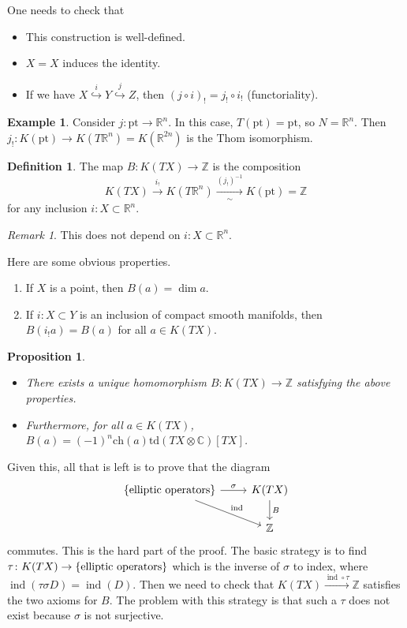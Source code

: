 \documentclass[leqno, openany]{memoir}
\newtheorem{prop}[thm]{Proposition}
\theoremstyle{definition}
\newtheorem{defn}[thm]{Definition}
\newtheorem{exm}[thm]{Example}
\theoremstyle{remark}
\newtheorem{rmk}[thm]{Remark}
\theoremstyle{plain}
\theoremstyle{definition}
\theoremstyle{remark}
\newcommand{\R}{\mathbb{R}}
\newcommand{\C}{\mathbb{C}}
\newcommand{\Z}{\mathbb{Z}}
\newcommand{\mr}[1]{\mathrm{#1}}
\DeclareMathOperator{\ind}{ind}
\begin{document}
One needs to check that \begin{itemize} \item This construction is
    well-defined.  \item $X = X$ induces the identity.  \item If we have $X
    \overset{i}{\hookrightarrow} Y \overset{j}{\hookrightarrow} Z$, then ${(j
    \circ i)}_! = j_! \circ i_{ ! }$ (functoriality).  \end{itemize}

\begin{exm} Consider $j \colon \mr{pt} \to \R^n$. In this case, $T(\mr{pt}) =
\mr{pt}$, so $N = \R^n$. Then $j_! \colon K(\mr{pt}) \to K(T\R^n) = K(\R^{2n})$
is the Thom isomorphism.  \end{exm}

\begin{defn} The map $B \colon K(TX) \to \Z$ is the composition \[ K(TX)
\xrightarrow{i_!} K(T\R^n) \xrightarrow[\sim]{{(j_!)}^{-1}} K(\mr{pt}) = \Z \]
for any inclusion $i \colon X \subset \R^n$.  \end{defn}

\begin{rmk} This does not depend on $i \colon X \subset \R^n$.  \end{rmk}

Here are some obvious properties.  \begin{enumerate} \item If $X$ is a point,
then $B(a) = \dim a$.  \item If $i \colon X \subset Y$ is an inclusion of
compact smooth manifolds, then $B(i_! a) = B(a)$ for all $a \in K(TX)$.
\end{enumerate}

\begin{prop}\leavevmode \begin{itemize} \item There exists a unique
    homomorphism $B \colon K(TX) \to \Z$ satisfying the above properties.
\item Furthermore, for all $a \in K(TX)$, $B(a) = {(-1)}^n \mr{ch}(a)
    \mr{td}(TX \otimes \C) [TX]$.  \end{itemize} \end{prop}

Given this, all that is left is to prove that the diagram \begin{equation*}
    \begin{tikzcd} \qty{\text{elliptic operators}} \ar{r}{\sigma} \ar{dr}{\ind}
    & K(TX) \ar{d}{B} \\ & \Z \end{tikzcd} \end{equation*} commutes. This is
    the hard part of the proof. The basic strategy is to find $\tau \colon
    K(TX) \to \qty{\text{elliptic operators}}$ which is the inverse of $\sigma$
    to index, where $\ind(\tau \sigma D) = \ind(D)$. Then we need to check that
    $K(TX) \xrightarrow{\ind \circ \tau} \Z$ satisfies the two axioms for $B$.
    The problem with this strategy is that such a $\tau$ does not exist because
    $\sigma$ is not surjective.
\end{document}
